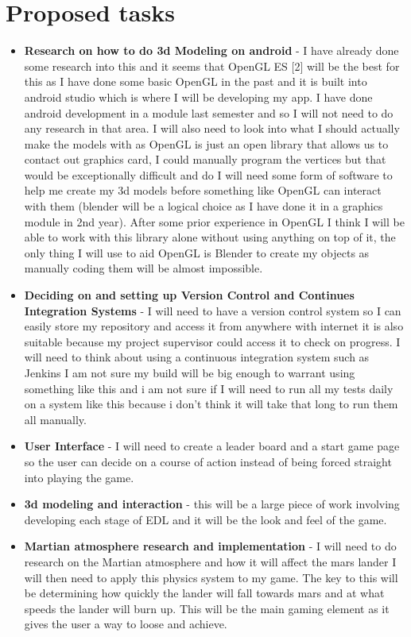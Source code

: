 \documentclass[11pt,fleqn,twoside]{article}
\begin{document}
\section{Proposed tasks}
\begin{itemize}
	\item \textbf{Research on how to do 3d Modeling on android} - I have already done some research into this and it seems that OpenGL ES [2] will be the best for this as I have done some basic OpenGL in the past and it is built into android studio which is where I will be developing my app. I have done android development in a module last semester and so I will not need to do any research in that area. I will also need to look into what I should actually make the models with as OpenGL is just an open library that allows us to contact out graphics card, I could manually program the vertices but that would be exceptionally difficult and do I will need some form of software to help me create my 3d models before something like OpenGL can interact with them (blender will be a logical choice as I have done it in a graphics module in 2nd year). After some prior experience in OpenGL I think I will be able to work with this library alone without using anything on top of it, the only thing I will use to aid OpenGL is Blender to create my objects as manually coding them will be almost impossible.
\item \textbf{Deciding on and setting up Version Control and Continues Integration Systems} - I will need to have a version control system so I can easily store my repository and access it from anywhere with internet it is also suitable because my project supervisor could access it to check on progress. I will need to think about using a continuous integration system such as Jenkins I am not sure my build will be big enough to warrant using something like this and i am not sure if I will need to run all my tests daily on a system like this because i don't think it will take that long to run them all manually.
\item \textbf{User Interface} - I will need to create a leader board and a start game page so the user can decide on a course of action instead of being forced straight into playing the game.
\item \textbf{3d modeling and interaction} - this will be a large piece of work involving developing each stage of EDL and it will be the look and feel of the game.
\item \textbf{Martian atmosphere research and implementation} - I will need to do research on the Martian atmosphere and how it will affect the mars lander I will then need to apply this physics system to my game. The key to this will be determining how quickly the lander will fall towards mars and at what speeds the lander will burn up. This will be the main gaming element as it gives the user a way to loose and achieve.

\end{itemize}
\end{document}
